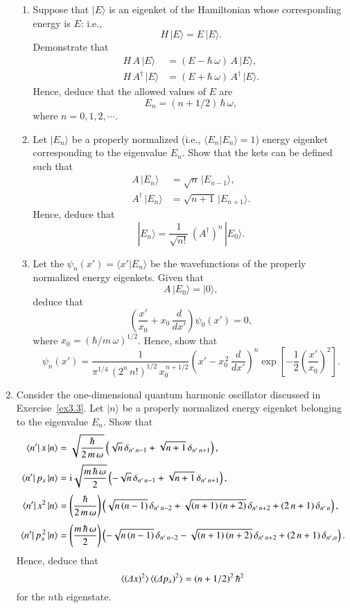 \begin{enumerate}[label=\thechapter.\arabic*,leftmargin=*,widest=9.20]
\begin{enumerate}
\item Suppose that $|E\rangle$ is an eigenket of the Hamiltonian whose corresponding energy is $E$: i.e.,
$$
H\,|E\rangle = E\,|E\rangle.
$$
Demonstrate that 
\begin{align}
H\,A\,|E\rangle &= (E-\hbar\,\omega)\,A\,|E\rangle,\nonumber\\[0.5ex]
H\,A^\dag\,|E\rangle &=  (E+\hbar\,\omega)\,A^\dag\,|E\rangle.\nonumber
\end{align}
Hence, deduce that the allowed values of $E$ are
$$
E_n = (n+1/2)\,\hbar\,\omega,
$$
where $n=0,1,2,\cdots$. 

\item Let $|E_n\rangle$ be a properly normalized  (i.e., $\langle E_n|E_n\rangle = 1$) energy eigenket corresponding to the
eigenvalue $E_n$. Show that the kets can be defined such that
\begin{align}
A\,|E_n\rangle &= \sqrt{n}\,|E_{n-1}\rangle,\nonumber\\[0.5ex]
A^\dag\,|E_n\rangle &= \sqrt{n+1}\,|E_{n+1}\rangle.\nonumber
\end{align}
Hence, deduce that 
$$
|E_n\rangle = \frac{1}{\sqrt{n!}}\,(A^\dag)^n\,|E_0\rangle.
$$

\item Let the $\psi_n(x')=\langle x'|E_n\rangle$ be the wavefunctions of the properly normalized energy eigenkets. 
Given that
$$
A\,|E_0\rangle = |0\rangle,
$$
deduce that
$$
\left(\frac{x'}{x_0}+x_0\,\frac{d}{d x'}\right)\psi_0(x')= 0,
$$
where $x_0=(\hbar/m\,\omega)^{1/2}$. Hence, show that
$$
\psi_n(x') = \frac{1}{\pi^{1/4}\,(2^n\,n!)^{1/2}\,x_0^{\,n+1/2}}\left(x'-x_0^{\,2}\,\frac{d}{dx'}\right)^n\exp\left[-\frac{1}{2}\left(
\frac{x'}{x_0}\right)^2\right].
$$
\end{enumerate}

\item Consider  the one-dimensional quantum harmonic oscillator discussed in Exercise~\ref{ex3.3}. Let $|n\rangle$ be
a properly normalized energy eigenket belonging to the eigenvalue $E_n$. Show that
\begin{align}
\langle n'|\,x\,|n\rangle &= \sqrt{\frac{\hbar}{2\,m\,\omega}}\left(\sqrt{n}\,\delta_{n'\,n-1}+\sqrt{n+1}\,\delta_{n'\,n+1}\right),\nonumber\\[0.5ex]
\langle n'|\,p_x\,|n\rangle &= {\rm i}\sqrt{\frac{m\,\hbar\,\omega}{2}}\left(-\sqrt{n}\,\delta_{n'\,n-1}+\sqrt{n+1}\,\delta_{n'\,n+1}\right),\nonumber\\[0.5ex]
\langle n'|\,x^2\,|n\rangle &= \left(\frac{\hbar}{2\,m\,\omega}\right)\left(\sqrt{n\,(n-1)}\,\delta_{n'\,n-2}+\sqrt{(n+1)\,(n+2)}\,\delta_{n'\,n+2}+ (2\,n+1)\,\delta_{n'\,n}\right),\nonumber\\[0.5ex]
\langle n'|\,p_x^{\,2}\,|n\rangle &= \left(\frac{m\,\hbar\,\omega}{2}\right)\left(-\sqrt{n\,(n-1)}\,\delta_{n'\,n-2}-\sqrt{(n+1)\,(n+2)}\,\delta_{n'\,n+2}+ (2\,n+1)\,\delta_{n',n}\right).\nonumber
\end{align}
Hence, deduce that
$$
\langle({\mit\Delta} x)^2\rangle\,\langle ({\mit\Delta}p_x)^2\rangle = (n+1/2)^2\,\hbar^2
$$
for the $n$th eigenstate. 


\end{enumerate}
